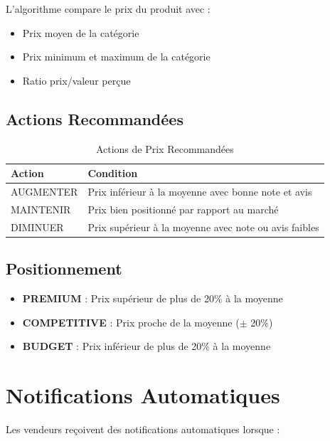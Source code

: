 \documentclass[12pt,a4paper]{report}
\begin{document}
L'algorithme compare le prix du produit avec :
\begin{itemize}[noitemsep]
    \item Prix moyen de la catégorie
    \item Prix minimum et maximum de la catégorie
    \item Ratio prix/valeur perçue
\end{itemize}

\subsection{Actions Recommandées}

\begin{table}[H]
    \centering
    \caption{Actions de Prix Recommandées}
    \begin{tabular}{lp{10cm}}
        \toprule
        \textbf{Action} & \textbf{Condition} \\
        \midrule
        AUGMENTER & Prix inférieur à la moyenne avec bonne note et avis \\
        MAINTENIR & Prix bien positionné par rapport au marché \\
        DIMINUER & Prix supérieur à la moyenne avec note ou avis faibles \\
        \bottomrule
    \end{tabular}
    \label{tab:price_actions}
\end{table}

\subsection{Positionnement}

\begin{itemize}[noitemsep]
    \item \textbf{PREMIUM} : Prix supérieur de plus de 20\% à la moyenne
    \item \textbf{COMPETITIVE} : Prix proche de la moyenne ($\pm$ 20\%)
    \item \textbf{BUDGET} : Prix inférieur de plus de 20\% à la moyenne
\end{itemize}

\section{Notifications Automatiques}

Les vendeurs reçoivent des notifications automatiques lorsque :
\end{document}

